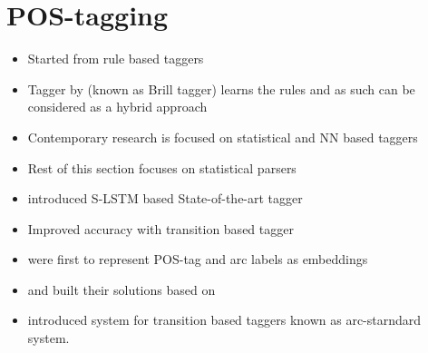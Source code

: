 \documentclass[12pt,a4paper,english
]{tutthesis}
\begin{document}
\section{POS-tagging}
\begin{itemize}
\item Started from rule based taggers
\item Tagger by \cite{Brill1992} (known as Brill tagger) learns the rules and as such can be considered as a hybrid approach
\item Contemporary research is focused on statistical and NN based taggers
\item Rest of this section focuses on statistical parsers
\item \cite{Ling2015} introduced S-LSTM based State-of-the-art tagger
\item \cite{Andor2016} Improved accuracy with transition based tagger
\item \cite{Chen2014} were first to represent POS-tag and arc labels as embeddings
\item \cite{Andor2016} and \cite{Weiss2015} built their solutions based on \cite{Chen2014}
\item \cite{Nivre2004} introduced system for transition based taggers known as arc-starndard system. \cite{Chen2014}
\end{itemize}
\end{document}
